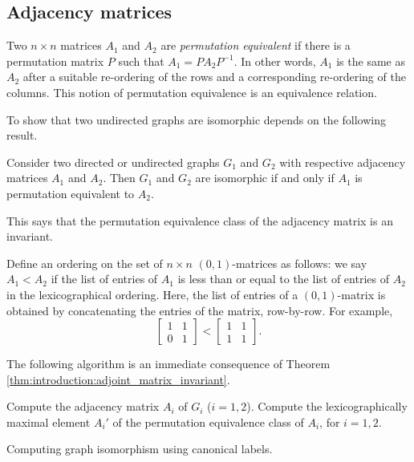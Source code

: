 
\subsection{Adjacency matrices}

Two $n \times n$ matrices $A_1$ and $A_2$ are
\emph{permutation equivalent} if there is a permutation matrix $P$
such that $A_1 = P A_2 P^{-1}$. In other words, $A_1$ is the same as
$A_2$ after a suitable re-ordering of the rows and a corresponding
re-ordering of the columns. This notion of permutation equivalence is
an equivalence relation.

To show that two undirected graphs are isomorphic depends on the
following result.

\begin{theorem}
\label{thm:introduction:adjoint_matrix_invariant}
Consider two directed or undirected graphs $G_1$ and $G_2$ with
respective adjacency matrices $A_1$ and $A_2$. Then $G_1$ and $G_2$
are isomorphic if and only if $A_1$ is permutation equivalent to
$A_2$.
\end{theorem}

This says that the permutation equivalence class of the adjacency
matrix is an invariant.

Define an ordering on the set of $n \times n$ $(0, 1)$-matrices as
follows: we say $A_1 < A_2$ if the list of entries of $A_1$ is less
than or equal to the list of entries of $A_2$ in the lexicographical
ordering. Here, the list of entries of a $(0, 1)$-matrix is obtained
by concatenating the entries of the matrix, row-by-row. For example,
\[
\begin{bmatrix}
1 & 1 \\
0 & 1
\end{bmatrix}
<
\begin{bmatrix}
1 & 1 \\
1 & 1
\end{bmatrix}.
\]

The following algorithm is an immediate consequence of
Theorem \ref{thm:introduction:adjoint_matrix_invariant}.

\begin{algorithm}[!htpb]
\SetLine
\dontprintsemicolon  %
\BlankLine
Compute the adjacency matrix $A_i$ of $G_i$ ($i = 1, 2$).\;
Compute the lexicographically maximal element $A_i'$ of the
permutation equivalence class of $A_i$, for $i = 1, 2$.\;
\caption{Computing graph isomorphism using canonical labels.}
\label{alg:introduction:graph_isomorphism_canonical_labels}
\end{algorithm}

